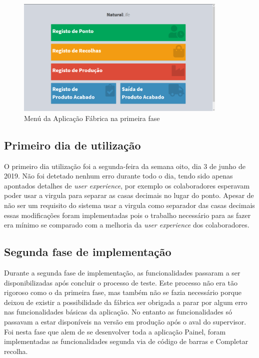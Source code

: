 \begin{figure}[htbp] 
	\begin{center}
		\includegraphics[width=0.90\textwidth,keepaspectratio]{figuras/AppPhp/0-menu_1_fase.png}
		\caption{Menú da Aplicação Fábrica na primeira fase}
		\label{fig:posinstall_fabrica_menu} 
	\end{center}
\end{figure}
\subsection{Primeiro dia de utilização}
O primeiro dia utilização foi a segunda-feira da semana oito, dia 3 de junho de 2019. Não foi detetado nenhum erro durante todo o dia, tendo sido apenas apontados detalhes de \textit{user experience}, por exemplo os colaboradores esperavam poder usar a virgula para separar as casas decimais no lugar do ponto. Apesar de não ser um requisito do sistema usar a virgula como separador das casas decimais essas modificações foram implementadas pois o trabalho necessário para as fazer era mínimo se comparado com a melhoria da \textit{user experience} dos colaboradores.

\subsection{Segunda fase de implementação}
Durante a segunda fase de implementação, as funcionalidades passaram a ser disponibilizadas após concluir o processo de teste. Este processo não era tão rigoroso como o da primeira fase, mas também não se fazia necessário porque deixou de existir a possibilidade da fábrica ser obrigada a parar por algum erro nas funcionalidades básicas da aplicação. No entanto as funcionalidades só passavam a estar disponíveis na versão em produção após o aval do supervisor. Foi nesta fase que alem de se desenvolver toda a aplicação Painel, foram implementadas as funcionalidades segunda via de código de barras e Completar recolha.

